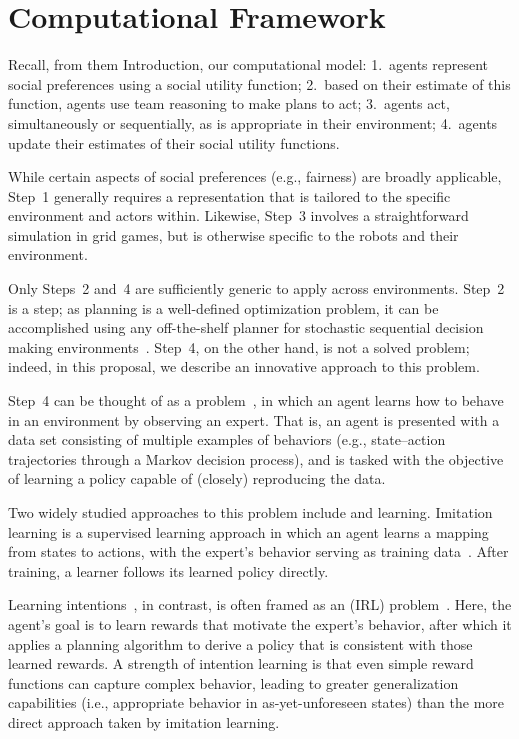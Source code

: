 
\section{Computational Framework}
\label{sec:process}

Recall, from them Introduction, our computational model:
1.~agents represent social preferences using a social utility function;
2.~based on their estimate of this function, agents use team reasoning to make plans to act;
3.~agents act, simultaneously or sequentially, as is appropriate in their environment;
4.~agents update their estimates of their social utility functions.

While certain aspects of social preferences (e.g., fairness) are broadly applicable,
Step~1 generally requires a representation that is tailored to the specific environment and actors within.
Likewise, Step~3 involves a straightforward simulation in grid games, but is
otherwise specific to the robots and their environment.

Only Steps~2 and~4 are sufficiently generic to apply across
environments.  Step~2 is a  step; as planning is
a well-defined optimization problem,
it can be accomplished using any off-the-shelf planner for
stochastic sequential decision making
environments~\cite{Barto95,bellman57,boutilier99,collins95,kearns99b,kocsis06}.
%
Step~4, on the other hand, is not a solved problem; indeed, in this
proposal,
we describe an innovative approach to this problem.

Step~4 can be thought of as a 
problem~\cite{argall09}, in which an agent learns how to behave in an
environment by observing an expert.  That is, an agent is presented
with a data set consisting of multiple examples of behaviors (e.g.,
state--action trajectories through a Markov decision process), and is
tasked with the objective of learning a policy capable of (closely)
reproducing the data.

Two widely studied approaches to this problem include
 and  learning.  Imitation learning
is a supervised learning approach in which an agent learns a mapping
from states to actions, with the expert's behavior serving as training
data~\cite{pomerleau93}.  After training, a learner follows its
learned policy directly.

Learning intentions~\cite{macglashan15b}, in contrast, is often framed
as an  (IRL)
problem~\cite{babes11,ng00}.  Here, the agent's goal is to learn
rewards that motivate the expert's behavior, after which it applies a
planning algorithm to derive a policy that is consistent with those
learned rewards.  A strength of intention learning is that even simple
reward functions can capture complex behavior, leading to greater
generalization capabilities (i.e., appropriate behavior in
as-yet-unforeseen states) than the more direct approach taken by
imitation learning.

